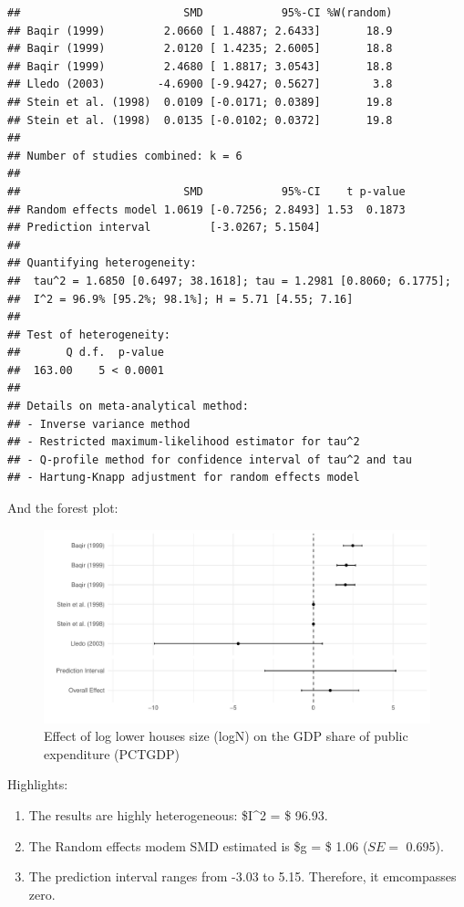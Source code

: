 \documentclass[
]{article}
\providecommand{\tightlist}{%
  \setlength{\itemsep}{0pt}\setlength{\parskip}{0pt}}
\begin{document}
\begin{verbatim}
##                         SMD            95%-CI %W(random)
## Baqir (1999)         2.0660 [ 1.4887; 2.6433]       18.9
## Baqir (1999)         2.0120 [ 1.4235; 2.6005]       18.8
## Baqir (1999)         2.4680 [ 1.8817; 3.0543]       18.8
## Lledo (2003)        -4.6900 [-9.9427; 0.5627]        3.8
## Stein et al. (1998)  0.0109 [-0.0171; 0.0389]       19.8
## Stein et al. (1998)  0.0135 [-0.0102; 0.0372]       19.8
## 
## Number of studies combined: k = 6
## 
##                         SMD            95%-CI    t p-value
## Random effects model 1.0619 [-0.7256; 2.8493] 1.53  0.1873
## Prediction interval         [-3.0267; 5.1504]             
## 
## Quantifying heterogeneity:
##  tau^2 = 1.6850 [0.6497; 38.1618]; tau = 1.2981 [0.8060; 6.1775];
##  I^2 = 96.9% [95.2%; 98.1%]; H = 5.71 [4.55; 7.16]
## 
## Test of heterogeneity:
##       Q d.f.  p-value
##  163.00    5 < 0.0001
## 
## Details on meta-analytical method:
## - Inverse variance method
## - Restricted maximum-likelihood estimator for tau^2
## - Q-profile method for confidence interval of tau^2 and tau
## - Hartung-Knapp adjustment for random effects model
\end{verbatim}

And the forest plot:

\begin{figure}
\centering
\includegraphics{appendixV5_files/figure-latex/unnamed-chunk-39-1.pdf}
\caption{Effect of log lower houses size (logN) on the GDP share of
public expenditure (PCTGDP)}
\end{figure}

Highlights:

\begin{enumerate}
\def\labelenumi{\arabic{enumi}.}
\tightlist
\item
  The results are highly heterogeneous: \$I\^{}2 = \$ 96.93.
\item
  The Random effects modem SMD estimated is \$g = \$ 1.06 (\(SE =\)
  0.695).
\item
  The prediction interval ranges from -3.03 to 5.15. Therefore, it
  emcompasses zero.
\end{enumerate}
\end{document}
